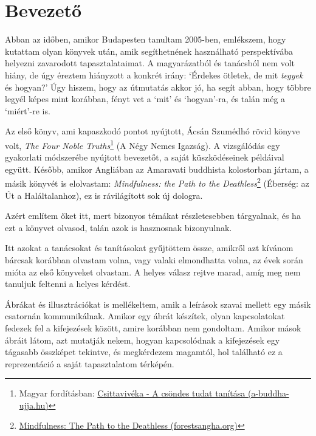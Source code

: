 \chapter{Bevezető}

\vspace{-\baselineskip}

Abban az időben, amikor Budapesten tanultam 2005-ben, emlékszem, hogy
kutattam olyan könyvek után, amik segíthetnének használható
perspektívába helyezni zavarodott tapasztalataimat. A magyarázatból és
tanácsból nem volt hiány, de úgy éreztem hiányzott a konkrét irány:
`Érdekes ötletek, de mit \emph{tegyek} és hogyan?' Úgy hiszem, hogy az
útmutatás akkor jó, ha segít abban, hogy többre legyél képes mint
korábban, fényt vet a `mit' és `hogyan'-ra, és talán még a `miért'-re
is.

Az első könyv, ami kapaszkodó pontot nyújtott, Ácsán Szumédhó rövid
könyve volt, \emph{The Four Noble Truths}\footnote{Magyar fordításban:
  \href{https://a-buddha-ujja.hu/books/csittaviveka/hu}{Csittavivéka - A
  csöndes tudat tanítása (a-buddha-ujja.hu)}} (A Négy Nemes Igazság). A
vizsgálódás egy gyakorlati módszerébe nyújtott bevezetőt, a saját
küszködéseinek példáival együtt. Később, amikor Angliában az Amaravati
buddhista kolostorban jártam, a másik könyvét is elolvastam:
\emph{Mindfulness: the Path to the Deathless}\footnote{\href{https://forestsangha.org/teachings/books/mindfulness-the-path-to-the-deathless?language=English}{Mindfulness:
  The Path to the Deathless (forestsangha.org)}} (Éberség: az Út a
Haláltalanhoz), ez is rávilágított sok új dologra.

Azért említem őket itt, mert bizonyos témákat részletesebben tárgyalnak,
és ha ezt a könyvet olvasod, talán azok is hasznosnak bizonyulnak.

\enlargethispage*{2\baselineskip}

Itt azokat a tanácsokat és tanításokat gyűjtöttem össze, amikről azt
kívánom bárcsak korábban olvastam volna, vagy valaki elmondhatta volna,
az évek során mióta az első könyveket olvastam. A helyes válasz rejtve
marad, amíg meg nem tanuljuk feltenni a helyes kérdést.

Ábrákat és illusztrációkat is mellékeltem, amik a leírások szavai
mellett egy másik csatornán kommunikálnak. Amikor egy ábrát készítek,
olyan kapcsolatokat fedezek fel a kifejezések között, amire korábban nem
gondoltam. Amikor mások ábráit látom, azt mutatják nekem, hogyan
kapcsolódnak a kifejezések egy tágasabb összképet tekintve, és
megkérdezem magamtól, hol található ez a reprezentáció a saját
tapasztalatom térképén.

